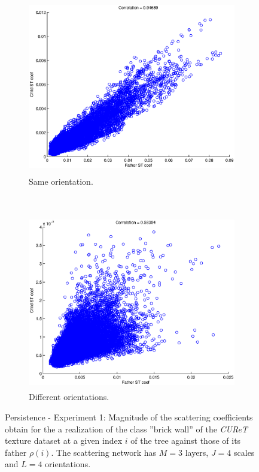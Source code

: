 \documentclass[a4paper,11pt]{report}
\begin{document}
		\begin{figure}[h]
				\begin{center}
					\begin{subfigure}[t]{0.48\textwidth}
						\centering
						\includegraphics[height=3in]{persist_uiuc_layer2-3_highCor.eps}
						\caption{Same orientation.}%
						\label{subfig:same orientation}
					\end{subfigure}%
					~
					\begin{subfigure}[t]{0.48\textwidth}
						\centering
						\includegraphics[height=3in]{persist_uiuc_layer2-3_lowCor.eps}
						\caption{Different orientations.} %
						\label{subfig:dif orientation}
					\end{subfigure}%
					\caption[Persistence - Experiment 1.]{\centering Persistence - Experiment 1: Magnitude of the scattering coefficients obtain for the a realization of the class ''brick wall'' of the \textit{CUReT} texture dataset at a given index $i$ of the tree against those of its father $\rho(i)$. The scattering network has $M=3$ layers, $J=4$ scales and $L=4$ orientations.}
					\label{fig:Persistence - 1}
				\end{center}
		\end{figure} 
\end{document}
